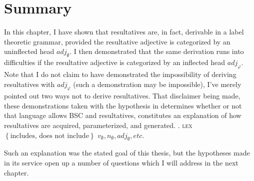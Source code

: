 \documentclass[MilwayThesis]{subfiles}
\begin{document}
\section{Summary}
In this chapter, I have shown that resultatives are, in fact, derivable in a label theoretic grammar, provided the resultative adjective is categorized by an uninflected head $adj_\emptyset$.
I then demonstrated that the same derivation runs into difficulties if the resultative adjective is categorized by an inflected head $adj_\varphi$.
Note that I do not claim to have demonstrated the impossibility of deriving resultatives with $adj_\varphi$ (such a demonstration may be impossible), I've merely pointed out two ways not to derive resultatives.
That disclaimer being made, these demonstrations taken with the hypothesis in \Next determines whether or not that language allows BSC and resultatives, constitutes an explanation of how resultatives are acquired, parameterized, and generated.
\ex. \textsc{lex} $\left\{ \text{includes, does not include} \right\}$ $v_\emptyset, n_\emptyset, adj_\emptyset, etc.$

Such an explanation was the stated goal of this thesis, but the hypotheses made in its service open up a number of questions which I will address in the next chapter.
\end{document}
